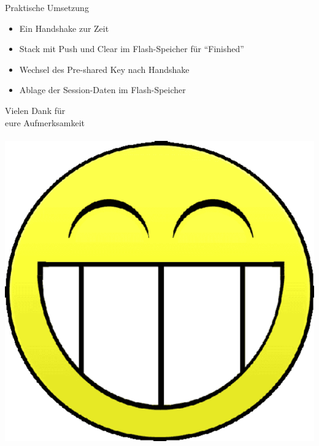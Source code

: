\documentclass{beamer}
\begin{document}
\begin{frame}{Praktische Umsetzung}
  \begin{itemize}
    \item Ein Handshake zur Zeit
    \item Stack mit Push und Clear im Flash-Speicher für "`Finished"'
    \item Wechsel des Pre-shared Key nach Handshake
    \item Ablage der Session-Daten im Flash-Speicher
  \end{itemize}
\end{frame}

\begin{frame}{}
  \begin{center}
    \begin{LARGE}
      Vielen Dank für\\
      eure Aufmerksamkeit\\
      ~\\
      \includegraphics[scale=0.2]{pic/smilie.png}
    \end{LARGE}
  \end{center}
\end{frame}
\end{document}
